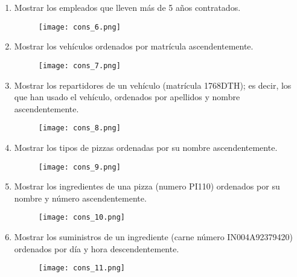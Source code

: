 \documentclass[a4paper]{article}
\begin{document}
\begin{enumerate}
    \item Mostrar los empleados que lleven más de 5 años contratados.

    \begin{figure}[H]
        \centering
        \texttt{[image: cons\_6.png]}
        \label{fig:cons_6}
    \end{figure}

    \newpage
    
    \item Mostrar los vehículos ordenados por matrícula ascendentemente.

    \begin{figure}[H]
        \centering
        \texttt{[image: cons\_7.png]}
        \label{fig:cons_7}
    \end{figure}

    \item Mostrar los repartidores de un vehículo (matrícula 1768DTH); es decir, los que han usado el vehículo, ordenados por apellidos y nombre ascendentemente.

    \begin{figure}[H]
        \centering
        \texttt{[image: cons\_8.png]}
        \label{fig:cons_8}
    \end{figure}

    \item Mostrar los tipos de pizzas ordenadas por su nombre ascendentemente.

    \begin{figure}[H]
        \centering
        \texttt{[image: cons\_9.png]}
        \label{fig:cons_9}
    \end{figure}

    \newpage

    \item Mostrar los ingredientes de una pizza (numero PI110) ordenados por su nombre y número ascendentemente.
    
    \begin{figure}[H]
        \centering
        \texttt{[image: cons\_10.png]}
        \label{fig:cons_10}
    \end{figure}

    \item Mostrar los suministros de un ingrediente (carne número IN004A92379420) ordenados por día y hora descendentemente.

    \begin{figure}[H]
        \centering
        \texttt{[image: cons\_11.png]}
        \label{fig:cons_11}
    \end{figure}
    
\end{enumerate}
\end{document}
